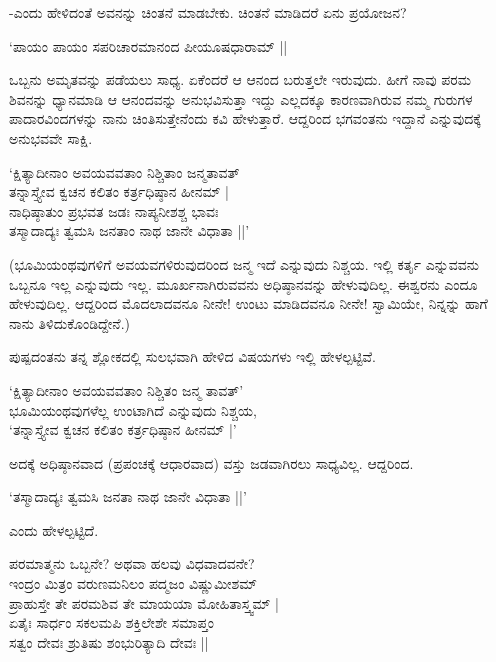 -ಎಂದು ಹೇಳಿದಂತೆ ಅವನನ್ನು ಚಿಂತನೆ ಮಾಡಬೇಕು. ಚಿಂತನೆ ಮಾಡಿದರೆ ಏನು ಪ್ರಯೋಜನ?

\begin{shloka}
`ಪಾಯಂ ಪಾಯಂ ಸಪರಿಚಾರಮಾನಂದ ಪೀಯೂಷಧಾರಾಮ್ ||
\end{shloka}

ಒಬ್ಬನು ಅಮೃತವನ್ನು ಪಡೆಯಲು ಸಾಧ್ಯ. ಏಕೆಂದರೆ ಆ ಆನಂದ ಬರುತ್ತಲೇ ಇರುವುದು. ಹೀಗೆ ನಾವು ಪರಮ ಶಿವನನ್ನು ಧ್ಯಾನಮಾಡಿ ಆ ಆನಂದವನ್ನು ಅನುಭವಿಸುತ್ತಾ ಇದ್ದು ಎಲ್ಲದಕ್ಕೂ ಕಾರಣವಾಗಿರುವ ನಮ್ಮ ಗುರುಗಳ ಪಾದಾರವಿಂದಗಳನ್ನು ನಾನು ಚಿಂತಿಸುತ್ತೇನೆಂದು ಕವಿ ಹೇಳುತ್ತಾರೆ. ಆದ್ದರಿಂದ ಭಗವಂತನು ಇದ್ದಾನೆ ಎನ್ನುವುದಕ್ಕೆ ಅನುಭವವೇ ಸಾಕ್ಷಿ.

\begin{shloka}
`ಕ್ಷಿತ್ಯಾದೀನಾಂ ಅವಯವವತಾಂ ನಿಶ್ಚಿತಾಂ ಜನ್ಮತಾವತ್\\
ತನ್ನಾಸ್ತ್ಯೇವ ಕ್ವಚನ ಕಲಿತಂ ಕರ್ತ್ರಧಿಷ್ಠಾನ ಹೀನಮ್ |\\
ನಾಧಿಷ್ಠಾತುಂ ಪ್ರಭವತ ಜಡಃ ನಾಪ್ಯನೀಶಶ್ಚ ಭಾವಃ\\
ತಸ್ಮಾದಾದ್ಯಃ ತ್ವಮಸಿ ಜನತಾಂ ನಾಥ ಜಾನೇ ವಿಧಾತಾ ||'
\end{shloka}

(ಭೂಮಿಯಂಥವುಗಳಿಗೆ ಅವಯವಗಳಿರುವುದರಿಂದ ಜನ್ಮ ಇದೆ ಎನ್ನುವುದು ನಿಶ್ಚಯ. ಇಲ್ಲಿ ಕರ್ತೃ ಎನ್ನುವವನು ಒಬ್ಬನೂ ಇಲ್ಲ ಎನ್ನುವುದು ಇಲ್ಲ. ಮೂರ್ಖನಾಗಿರುವವನು ಅಧಿಷ್ಠಾನವನ್ನು ಹೇಳುವುದಿಲ್ಲ. ಈಶ್ವರನು ಎಂದೂ ಹೇಳುವುದಿಲ್ಲ. ಆದ್ದರಿಂದ ಮೊದಲಾದವನೂ ನೀನೇ! ಉಂಟು ಮಾಡಿದವನೂ ನೀನೇ! ಸ್ವಾಮಿಯೇ, ನಿನ್ನನ್ನು ಹಾಗೆ ನಾನು ತಿಳಿದುಕೊಂಡಿದ್ದೇನೆ.)

ಪುಷ್ಪದಂತನು ತನ್ನ ಶ್ಲೋಕದಲ್ಲಿ ಸುಲಭವಾಗಿ ಹೇಳಿದ ವಿಷಯಗಳು ಇಲ್ಲಿ ಹೇಳಲ್ಪಟ್ಟಿವೆ.

\begin{shloka}
`ಕ್ಷಿತ್ಯಾದೀನಾಂ ಅವಯವವತಾಂ ನಿಶ್ಚಿತಂ ಜನ್ಮ ತಾವತ್'\\
ಭೂಮಿಯಂಥವುಗಳೆಲ್ಲ ಉಂಟಾಗಿದೆ ಎನ್ನುವುದು ನಿಶ್ಚಯ,\\
`ತನ್ನಾಸ್ತ್ಯೇವ ಕ್ವಚನ ಕಲಿತಂ ಕರ್ತ್ರಧಿಷ್ಠಾನ ಹೀನಮ್ |'
\end{shloka}

ಅದಕ್ಕೆ ಅಧಿಷ್ಠಾನವಾದ (ಪ್ರಪಂಚಕ್ಕೆ ಆಧಾರವಾದ) ವಸ್ತು ಜಡವಾಗಿರಲು ಸಾಧ್ಯವಿಲ್ಲ. ಆದ್ದರಿಂದ.

\begin{shloka}
`ತಸ್ಮಾದಾದ್ಯಃ ತ್ವಮಸಿ ಜನತಾ ನಾಥ ಜಾನೇ ವಿಧಾತಾ ||'
\end{shloka}

ಎಂದು ಹೇಳಲ್ಪಟ್ಟಿದೆ.

\begin{shloka}
ಪರಮಾತ್ಮನು ಒಬ್ಬನೇ? ಅಥವಾ ಹಲವು ವಿಧವಾದವನೇ?\\[5pt]
ಇಂದ್ರಂ ಮಿತ್ರಂ ವರುಣಮನಿಲಂ ಪದ್ಮಜಂ ವಿಷ್ಣುಮೀಶಮ್\\
ಪ್ರಾಹುಸ್ತೇ ತೇ ಪರಮಶಿವ ತೇ ಮಾಯಯಾ ಮೋಹಿತಾಸ್ತ್ವಮ್ |\\[5pt]
ಏತೈಃ ಸಾರ್ಧಂ ಸಕಲಮಪಿ ಶಕ್ತಿಲೇಶೇ ಸಮಾಪ್ತಂ\\
ಸತ್ವಂ ದೇವಃ ಶ್ರುತಿಷು ಶಂಭುರಿತ್ಯಾದಿ ದೇವಃ ||
\end{shloka}

